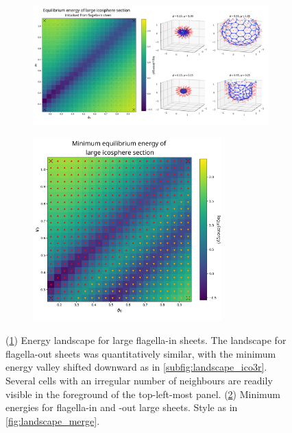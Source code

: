 \begin{figure}
	\centering
	\begin{subfigure}[b]{\textwidth}
		\centering
		\includegraphics[width=\textwidth]{landscape_ico4.png}
		\caption{}
		\label{subfig:landscape_ico4}
	\end{subfigure}
	\begin{subfigure}[b]{\textwidth}
		\centering
		\includegraphics[width=0.8\textwidth]{landscape_ico4ico4r_merge.png}
		\caption{}
		\label{subfig:landscape4_merge}
	\end{subfigure}
	\caption[Energy landscape for flagella-in and flagella-out curved sheets]{(\ref{subfig:landscape_ico4}) Energy landscape for large flagella-in sheets. The landscape for flagella-out sheets was quantitatively similar, with the minimum energy valley shifted downward as in \cref{subfig:landscape_ico3r}. Several cells with an irregular number of neighbours are readily visible in the foreground of the top-left-most panel. (\ref{subfig:landscape4_merge}) Minimum energies for flagella-in and -out large sheets. Style as in \cref{fig:landscape_merge}.}
	\label{fig:landscape_ico4}
\end{figure}

